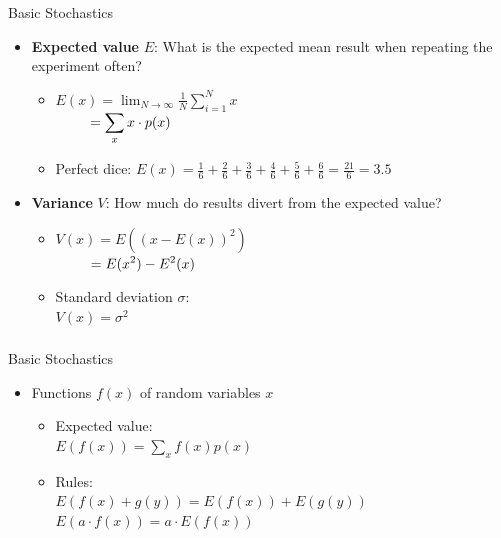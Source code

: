 \documentclass[utf8,stillsansserifmath,fleqn,t]{beamer}
\begin{document}
\begin{frame}[label=basic-stochastics-1]
\frametitle{\insertsection}
Basic Stochastics
\begin{itemize}
\item \textbf{Expected value} $E$:
    What is the expected mean result when repeating the experiment often?
\begin{itemize}
\item $\displaystyle E(x) = \lim_{N\rightarrow\infty} \frac{1}{N} \sum_{i=1}^{N} x$\\
      $\displaystyle \hphantom{E(x)} = \sum_x x \cdot p(x)$
\item Perfect dice: $E(x) = \frac{1}{6} + \frac{2}{6} + \frac{3}{6} + \frac{4}{6}
+ \frac{5}{6} + \frac{6}{6} = \frac{21}{6} = 3.5$
\end{itemize}
\item \textbf{Variance} $V$:
    How much do results divert from the expected value?
\begin{itemize}
\item $\displaystyle V(x) = E\left( (x - E(x))^2 \right)$\\
      $\displaystyle \hphantom{V(x)} = E(x^2) - E^2(x)$
\item Standard deviation $\sigma$:\\
    $V(x) = \sigma^2$\\
\end{itemize}
\end{itemize}
\end{frame}

\begin{frame}
\frametitle{\insertsection}
Basic Stochastics
\begin{itemize}
\item Functions $f(x)$ of random variables $x$
\begin{itemize}
\item Expected value:\\
    $\displaystyle E(f(x)) = \sum_x f(x)p(x)$
\item Rules:\\
    $\displaystyle E(f(x) + g(y)) = E(f(x)) + E(g(y))$\\
    $\displaystyle E(a \cdot f(x)) = a \cdot E(f(x))$
\end{itemize}
\end{itemize}
\end{frame}
\end{document}

